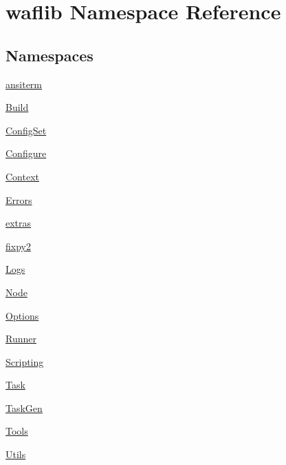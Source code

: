 \hypertarget{namespacewaflib}{}\section{waflib Namespace Reference}
\label{namespacewaflib}
\subsection*{Namespaces}
\begin{DoxyCompactItemize}
\item 
 \hyperlink{namespacewaflib_1_1ansiterm}{ansiterm}
\item 
 \hyperlink{namespacewaflib_1_1_build}{Build}
\item 
 \hyperlink{namespacewaflib_1_1_config_set}{Config\+Set}
\item 
 \hyperlink{namespacewaflib_1_1_configure}{Configure}
\item 
 \hyperlink{namespacewaflib_1_1_context}{Context}
\item 
 \hyperlink{namespacewaflib_1_1_errors}{Errors}
\item 
 \hyperlink{namespacewaflib_1_1extras}{extras}
\item 
 \hyperlink{namespacewaflib_1_1fixpy2}{fixpy2}
\item 
 \hyperlink{namespacewaflib_1_1_logs}{Logs}
\item 
 \hyperlink{namespacewaflib_1_1_node}{Node}
\item 
 \hyperlink{namespacewaflib_1_1_options}{Options}
\item 
 \hyperlink{namespacewaflib_1_1_runner}{Runner}
\item 
 \hyperlink{namespacewaflib_1_1_scripting}{Scripting}
\item 
 \hyperlink{namespacewaflib_1_1_task}{Task}
\item 
 \hyperlink{namespacewaflib_1_1_task_gen}{Task\+Gen}
\item 
 \hyperlink{namespacewaflib_1_1_tools}{Tools}
\item 
 \hyperlink{namespacewaflib_1_1_utils}{Utils}
\end{DoxyCompactItemize}
